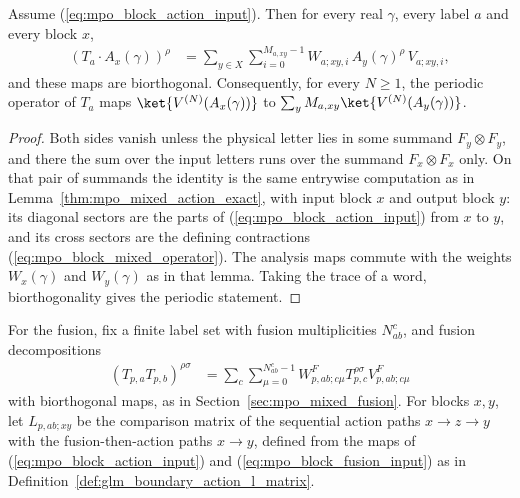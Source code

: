 \begin{lemma}
    \label{thm:mpo_block_mixed_action}
    \leanok
    Assume (\ref{eq:mpo_block_action_input}). Then for every real $\gamma$,
    every label $a$ and every block $x$,
    \begin{align}
        (T_a\cdot A_x(\gamma))^\rho
         & =\sum_{y\in X}\sum_{i=0}^{M_{a,xy}-1}
        W_{a;xy,i}\,A_y(\gamma)^\rho\,V_{a;xy,i},
        \label{eq:mpo_block_mixed_action}
    \end{align}
    and these maps are biorthogonal. Consequently, for every $N\geq1$, the
    periodic operator of $T_a$ maps
    $\ket{V^{(N)}(A_x(\gamma))}$ to
    $\sum_yM_{a,xy}\ket{V^{(N)}(A_y(\gamma))}$.
\end{lemma}
\begin{proof}
    \leanok
    Both sides vanish unless the physical letter lies in some summand
    $F_y\otimes F_y$, and there the sum over the input letters runs over
    the summand $F_x\otimes F_x$ only. On that pair of summands the
    identity is the same entrywise computation as in
    Lemma~\ref{thm:mpo_mixed_action_exact}, with input block $x$ and
    output block $y$: its diagonal sectors are the parts of
    (\ref{eq:mpo_block_action_input}) from $x$ to $y$, and its cross sectors
    are the defining contractions (\ref{eq:mpo_block_mixed_operator}). The
    analysis maps commute with the weights $W_x(\gamma)$ and $W_y(\gamma)$
    as in that lemma. Taking the trace of a word, biorthogonality gives the
    periodic statement.
\end{proof}

For the fusion, fix a finite label set with fusion multiplicities
$N_{ab}^c$, and fusion decompositions
\begin{align}
    (T_{p,a}T_{p,b})^{\rho\sigma}
     & =\sum_{c}\sum_{\mu=0}^{N_{ab}^c-1}
    W^F_{p,ab;c\mu}T_{p,c}^{\rho\sigma}V^F_{p,ab;c\mu}
    \label{eq:mpo_block_fusion_input}
\end{align}
with biorthogonal maps, as in Section~\ref{sec:mpo_mixed_fusion}. For
blocks $x,y$, let $L_{p,ab;xy}$ be the comparison matrix of the
sequential action paths $x\to z\to y$ with the fusion-then-action paths
$x\to y$, defined from the maps of (\ref{eq:mpo_block_action_input}) and
(\ref{eq:mpo_block_fusion_input}) as in
Definition~\ref{def:glm_boundary_action_l_matrix}.

